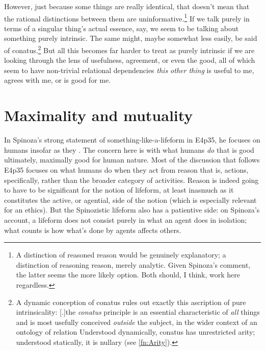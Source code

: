 \documentclass{article}
\newcommand{\dash}{\unskip{—}}
\begin{document}
However, just because some things are really identical, that doesn't mean that the rational distinctions between them are uninformative.\footnote{A distinction of reasoned reason would be genuinely explanatory; a distinction of reasoning reason, merely analytic. Given Spinoza's  comment, the latter seems the more likely option. Both should, I think, work here regardless.}
If we talk purely in terms of a singular thing's actual essence, say, we seem to be talking about something purely intrinsic. The same might, maybe somewhat less easily, be said of conatus.\footnote{A dynamic conception of conatus rules out exactly this ascription of pure intrinsicality: [.]{the \emph{conatus} principle is an essential characteristic of \emph{all} things and is most usefully conceived \emph{outside} the subject, in the wider context of an ontology of relation} Understood dynamically, conatus has unrestricted arity; understood statically, it is nullary (see \cref{fn:Arity}).}
But all this becomes far harder to treat as purely intrinsic if we are looking through the lens of usefulness, agreement, or even the good, all of which seem to have non-trivial relational dependencies \dash \emph{this other thing} is useful to me, agrees with me, or is good for me.

\section{Maximality and mutuality}\label{sec:Mutuality}

In Spinoza's strong statement of something-like-a-lifeform in E4p35, he focuses on humans insofar as they . The concern here is with what humans \emph{do} that is good \dash ultimately, maximally good \dash for human nature. Most of the discussion that follows E4p35 focuses on what humans do when they act from reason \dash that is, actions, specifically, rather than the broader category of activities. Reason is indeed going to have to be significant for the notion of lifeform, at least inasmuch as it constitutes the active, or agential, side of the notion (which is especially relevant for an ethics). But the Spinozistic lifeform also has a patientive side: on Spinoza's account, a lifeform does not consist purely in what an agent does in isolation; what counts is how what's done by agents affects others.
\end{document}
